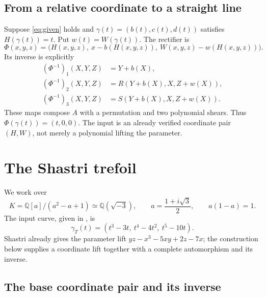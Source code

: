 \documentclass[11pt,a4paper]{article}
\newcommand{\Q}{\mathbb Q}
\begin{document}
\subsection{From a relative coordinate to a straight line}

Suppose \eqref{eq:given} holds and
$\gamma(t)=(b(t),c(t),d(t))$ satisfies $H(\gamma(t))=t$.
Put $w(t)=W(\gamma(t))$. The rectifier is
\begin{equation}\label{eq:straighten}
\Phi(x,y,z)=\bigl(H(x,y,z),\ x-b(H(x,y,z)),\
W(x,y,z)-w(H(x,y,z))\bigr).
\end{equation}
Its inverse is explicitly
\begin{equation}\label{eq:straighten-inverse}
\begin{aligned}
(\Phi^{-1})_1(X,Y,Z)&=Y+b(X),\\
(\Phi^{-1})_2(X,Y,Z)&=R(Y+b(X),X,Z+w(X)),\\
(\Phi^{-1})_3(X,Y,Z)&=S(Y+b(X),X,Z+w(X)).
\end{aligned}
\end{equation}
These maps compose $A$ with a permutation and two polynomial shears.
Thus $\Phi(\gamma(t))=(t,0,0)$. The input is an already verified
coordinate pair $(H,W)$, not merely a polynomial lifting the parameter.

\clearpage
\section{The Shastri trefoil}

We work over
\[
K=\Q[a]/(a^2-a+1)\simeq\Q(\sqrt{-3}),\qquad
a=\frac{1+i\sqrt3}{2},\qquad a(1-a)=1.
\]
The input curve, given in \cite[\S3, Example~1, pp.~14--15]{Shastri}, is
\begin{equation}\label{eq:trefoil}
\gamma_T(t)=(t^3-3t,\ t^4-4t^2,\ t^5-10t).
\end{equation}
Shastri already gives the parameter lift
$yz-x^3-5xy+2z-7x$; the construction below supplies a coordinate lift
together with a complete automorphism and its inverse.

\subsection{The base coordinate pair and its inverse}
\end{document}
